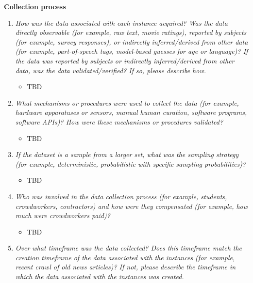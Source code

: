 \documentclass[
  letterpaper,
  DIV=11,
  numbers=noendperiod]{scrartcl}
\providecommand{\tightlist}{%
  \setlength{\itemsep}{0pt}\setlength{\parskip}{0pt}}\usepackage{longtable,booktabs,array}
\begin{document}
\textbf{Collection process}

\begin{enumerate}
\def\labelenumi{\arabic{enumi}.}
\tightlist
\item
  \emph{How was the data associated with each instance acquired? Was the
  data directly observable (for example, raw text, movie ratings),
  reported by subjects (for example, survey responses), or indirectly
  inferred/derived from other data (for example, part-of-speech tags,
  model-based guesses for age or language)? If the data was reported by
  subjects or indirectly inferred/derived from other data, was the data
  validated/verified? If so, please describe how.}

  \begin{itemize}
  \tightlist
  \item
    TBD
  \end{itemize}
\item
  \emph{What mechanisms or procedures were used to collect the data (for
  example, hardware apparatuses or sensors, manual human curation,
  software programs, software APIs)? How were these mechanisms or
  procedures validated?}

  \begin{itemize}
  \tightlist
  \item
    TBD
  \end{itemize}
\item
  \emph{If the dataset is a sample from a larger set, what was the
  sampling strategy (for example, deterministic, probabilistic with
  specific sampling probabilities)?}

  \begin{itemize}
  \tightlist
  \item
    TBD
  \end{itemize}
\item
  \emph{Who was involved in the data collection process (for example,
  students, crowdworkers, contractors) and how were they compensated
  (for example, how much were crowdworkers paid)?}

  \begin{itemize}
  \tightlist
  \item
    TBD
  \end{itemize}
\item
  \emph{Over what timeframe was the data collected? Does this timeframe
  match the creation timeframe of the data associated with the instances
  (for example, recent crawl of old news articles)? If not, please
  describe the timeframe in which the data associated with the instances
  was created.}


\end{enumerate}
\end{document}
